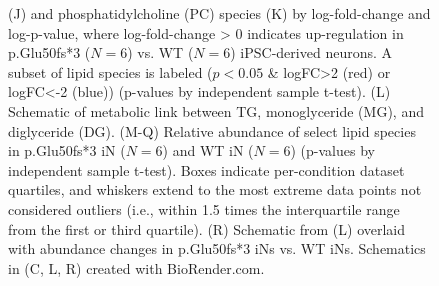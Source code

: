 \begin{figure}[ht]
{        (J) and phosphatidylcholine (PC) species (K) by log-fold-change and log-p-value, where log-fold-change > 0 indicates up-regulation in p.Glu50fs*3 ($N=6$) vs. WT ($N=6$) iPSC-derived neurons. A subset of lipid species is labeled ($p<0.05$ \& logFC>2 (red) or logFC<-2 (blue)) (p-values by independent sample t-test). 
        (L) Schematic of metabolic link between TG, monoglyceride (MG), and diglyceride (DG). 
        (M-Q) Relative abundance of select lipid species in p.Glu50fs*3 iN ($N=6$) and WT iN ($N=6$) (p-values by independent sample t-test). Boxes indicate per-condition dataset quartiles, and whiskers extend to the most extreme data points not considered outliers (i.e., within 1.5 times the interquartile range from the first or third quartile). (R) Schematic from (L) overlaid with abundance changes in p.Glu50fs*3 iNs vs. WT iNs. Schematics in (C, L, R) created with BioRender.com.
    }
    \label{fig:main_lipids}
\end{figure}